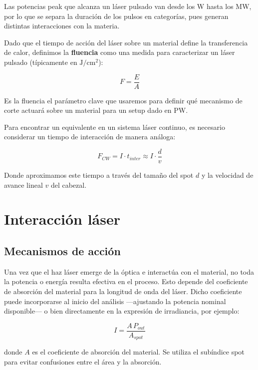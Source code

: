 Las potencias peak que alcanza un láser pulsado van desde los W hasta los MW, por lo que se separa la duración de los pulsos en categorías, pues generan distintas interacciones con la materia.

Dado que el tiempo de acción del láser sobre un material define la transferencia de calor, definimos la \textbf{fluencia} como una medida para caracterizar un láser pulsado (típicamente en $\si{\J\per\centi\meter\squared}$):

\begin{equation}
	F = \frac{E}{A}
\end{equation}

Es la fluencia el parámetro clave que usaremos para definir qué mecanismo de corte actuará sobre un material para un setup dado en PW.

Para encontrar un equivalente en un sistema láser continuo, es necesario considerar un tiempo de interacción de manera análoga:

\begin{equation}
	F_{CW} = I \cdot t_{inter} \approx I \cdot \frac{d}{v}
\end{equation}

Donde aproximamos este tiempo a través del tamaño del spot $d$ y la velocidad de avance lineal $v$ del cabezal.

\section{Interacción láser}

\subsection{Mecanismos de acción}

Una vez que el haz láser emerge de la óptica e interactúa con el material, no toda la potencia o energía resulta efectiva en el proceso. Esto depende del coeficiente de absorción del material para la longitud de onda del láser. Dicho coeficiente puede incorporarse al inicio del análisis —ajustando la potencia nominal disponible— o bien directamente en la expresión de irradiancia, por ejemplo:

\begin{equation}
	I = \frac{A \, P_{out}}{A_{spot}}
\end{equation}

donde $A$ es el coeficiente de absorción del material. Se utiliza el subíndice spot para evitar confusiones entre el área y la absorción.

